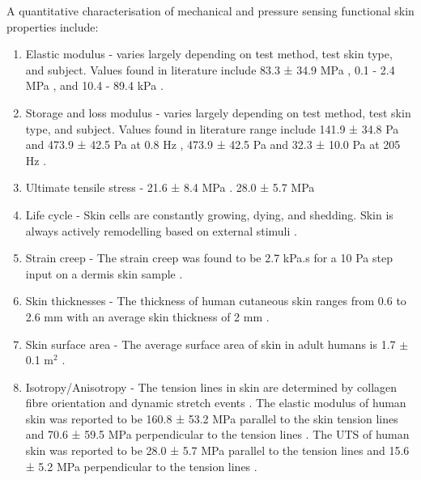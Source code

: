 A quantitative characterisation of mechanical and pressure sensing functional skin properties include:
\begin{enumerate}
    \item Elastic modulus -  varies largely depending on test method, test skin type, and subject. Values found in literature include 83.3 ± 34.9 MPa \cite{Annaidh2012}, 0.1 - 2.4 MPa \cite{Khaothong2010}, and 10.4 - 89.4 kPa \cite{Zheng1999}.
    \item Storage and loss modulus - varies largely depending on test method, test skin type, and subject. Values found in literature range include 141.9 ± 34.8 Pa and 473.9 ± 42.5 Pa at 0.8 Hz \cite{Holt2008}, 473.9 ± 42.5 Pa and 32.3 ± 10.0 Pa at 205 Hz \cite{Parvini2022}.
    \item Ultimate tensile stress - 21.6 ± 8.4 MPa \cite{Annaidh2012}. 28.0 ± 5.7 MPa \cite{Ottenio2015}
    \item Life cycle - Skin cells are constantly growing, dying, and shedding. Skin is always actively remodelling based on external stimuli \cite{McGrath2010}.
    \item Strain creep - The strain creep was found to be 2.7 kPa.s for a 10 Pa step input on a dermis skin sample \cite{Holt2008}.
    \item Skin thicknesses - The thickness of human cutaneous skin ranges from 0.6 to 2.6 mm with an average skin thickness of 2 mm \cite{Landry2021}.
    \item Skin surface area - The average surface area of skin in adult humans is 1.7 $\pm$ 0.1 m$^2$ \cite{Landry2021}.
    \item Isotropy/Anisotropy - The tension lines in skin are determined by collagen fibre orientation and dynamic stretch events \cite{Newell2007,Paul2018}. The elastic modulus of human skin was reported to be 160.8 ± 53.2 MPa parallel to the skin tension lines and 70.6 ± 59.5 MPa perpendicular to the tension lines \cite{Ottenio2015}. The UTS of human skin was reported to be 28.0 ± 5.7 MPa parallel to the tension lines and 15.6 ± 5.2 MPa perpendicular to the tension lines \cite{Ottenio2015}.    
\end{enumerate}

